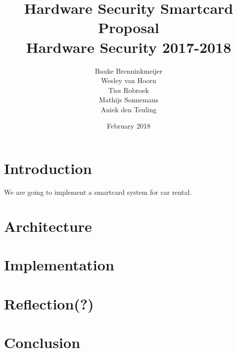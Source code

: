 \documentclass{article}
\title{Hardware Security Smartcard Proposal \\ Hardware Security 2017-2018}
\author{Bauke Brenninkmeijer \\Wesley van Hoorn \\Ties Robroek \\
Mathijs Sonnemans \\ Aniek den Teuling}
\date{February 2018}
\begin{document}
\maketitle

\section{Introduction}
We are going to implement a smartcard system for car rental.

\section{Architecture}





\section{Implementation}




\section{Reflection(?)}



\section{Conclusion}
\end{document}
